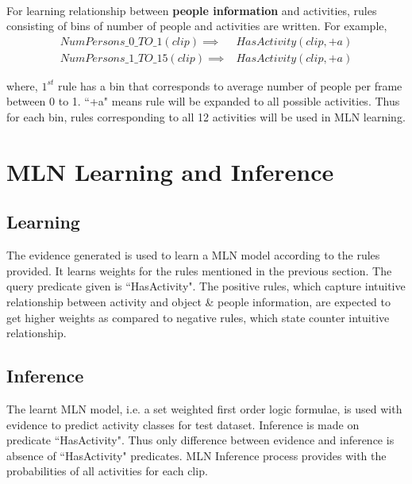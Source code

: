 ~ \\
For learning relationship between {\bf people information} and activities,
rules consisting of bins of number of people and activities are written.
For example,
\begin{equation}
	\begin{split}
		NumPersons\_0\_TO\_1(clip)\implies & HasActivity(clip,+a) \\
		NumPersons\_1\_TO\_15(clip)\implies & HasActivity(clip,+a)
	\end{split}
\end{equation}

where, $1^{st}$ rule has a bin that corresponds to average number of people 
per frame between 0 to 1.
``+a" means rule will be expanded to all possible activities. Thus for each bin,
rules corresponding to all 12 activities will be used in MLN learning.




\section{MLN Learning and Inference}
\subsection{Learning}
The evidence generated is used to learn a MLN model according to the rules provided.
It learns weights for the rules mentioned in the previous section. The query predicate
given is ``HasActivity". The positive rules, which capture intuitive relationship
between activity and object \& people information, are expected to get higher weights
as compared to negative rules, which state counter intuitive relationship.

\subsection{Inference}
The learnt MLN model, i.e. a set weighted first order logic formulae, is used with 
evidence to predict activity classes for test dataset.
Inference is made on predicate ``HasActivity". Thus only difference
between evidence and inference is absence of ``HasActivity" predicates.
MLN Inference process provides with the probabilities of all activities for
each clip. 

